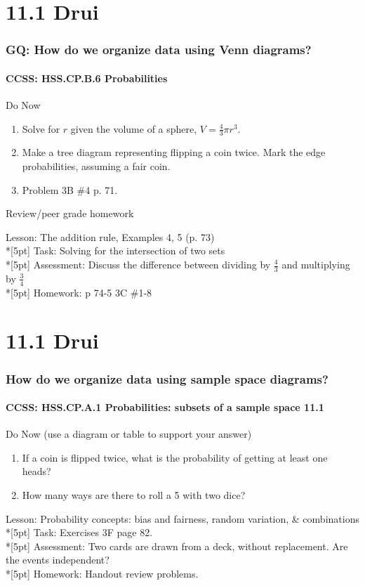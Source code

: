 \documentclass{beamer}
\begin{document}
  \section{11.1 Drui}
  \frame
  {
    \frametitle{GQ: How do we organize data using Venn diagrams?}
    \framesubtitle{CCSS: HSS.CP.B.6 Probabilities}

    \begin{block}{Do Now}
    \begin{enumerate}
        \item Solve for $r$ given the volume of a sphere, $V=\frac{4}{3} \pi r^3$.
        \item Make a tree diagram representing flipping a coin twice. Mark the edge probabilities, assuming a fair coin.
        \item Problem 3B \#4 p. 71.
    \end{enumerate}
    Review/peer grade homework
    \end{block}
    Lesson: The addition rule, Examples 4, 5 (p. 73)\\*[5pt]
    Task: Solving for the intersection of two sets\\*[5pt]
    Assessment: Discuss the difference between dividing by $\frac{4}{3}$ and multiplying by $\frac{3}{4}$\\*[5pt]
    Homework: p 74-5 3C \#1-8
  }

  \section{11.1 Drui}
  \frame
  {
    \frametitle{How do we organize data using sample space diagrams?}
    \framesubtitle{CCSS: HSS.CP.A.1 Probabilities: subsets of a sample space \qquad \alert{11.1}}

    \begin{block}{Do Now (use a diagram or table to support your answer)}
    \begin{enumerate}
        \item If a coin is flipped twice, what is the probability of getting at least one heads?
        \item How many ways are there to roll a 5 with two dice?
    \end{enumerate}
    \end{block}
    Lesson: Probability concepts: bias and fairness, random variation, \& combinations\\*[5pt]
    Task: Exercises 3F page 82.\\*[5pt]
    Assessment: Two cards are drawn from a deck, without replacement. Are the events independent?\\*[5pt]
    Homework: Handout review problems.
  }
\end{document}
